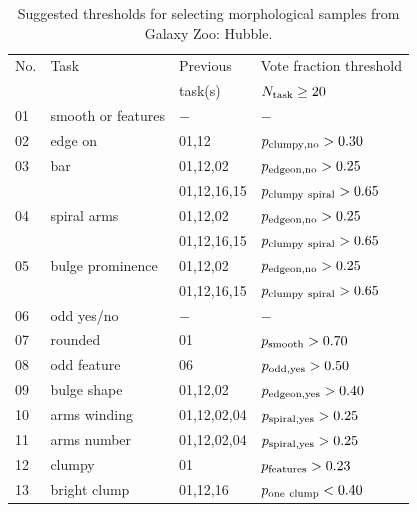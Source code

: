 \documentclass[twocolumn]{aastex6}
\begin{document}
\begin{table}
\caption{Suggested thresholds for selecting morphological samples from Galaxy Zoo: Hubble. \label{tbl:thresholds}}
\begin{tabular}{llll}
\hline\hline
No.      &  Task 	            & Previous         & Vote fraction threshold            \\
         &            	        & task(s)          & $N_{\rm task} \ge 20$              \\
\hline
01       & smooth or features   & $-$              & $-$                                \\
02       & edge on              & 01,12            & $p_{\rm clumpy,no}>0.30$           \\
03       & bar		            & 01,12,02         & $p_{\rm edgeon,no}>0.25$           \\
         &                      & 01,12,16,15      & $p_{\rm clumpy~spiral}>0.65$       \\
04       & spiral arms          & 01,12,02         & $p_{\rm edgeon,no}>0.25$           \\
         &                      & 01,12,16,15      & $p_{\rm clumpy~spiral}>0.65$       \\
05       & bulge prominence     & 01,12,02         & $p_{\rm edgeon,no}>0.25$           \\
         &                      & 01,12,16,15      & $p_{\rm clumpy~spiral}>0.65$       \\
06       & odd yes/no           & $-$              & $-$                                \\
07       & rounded              & 01               & $p_{\rm smooth}>0.70$              \\
08       & odd feature          & 06               & $p_{\rm odd,yes}> 0.50$            \\
09       & bulge shape          & 01,12,02         & $p_{\rm edgeon,yes}>0.40$          \\
10       & arms winding         & 01,12,02,04      & $p_{\rm spiral,yes}>0.25$          \\
11       & arms number          & 01,12,02,04      & $p_{\rm spiral,yes}>0.25$          \\
12       & clumpy               & 01               & $p_{\rm features}>0.23$            \\
13       & bright clump         & 01,12,16         & $p_{\rm one~clump}< 0.40$          \\

\end{tabular}
\end{table}
\end{document}
